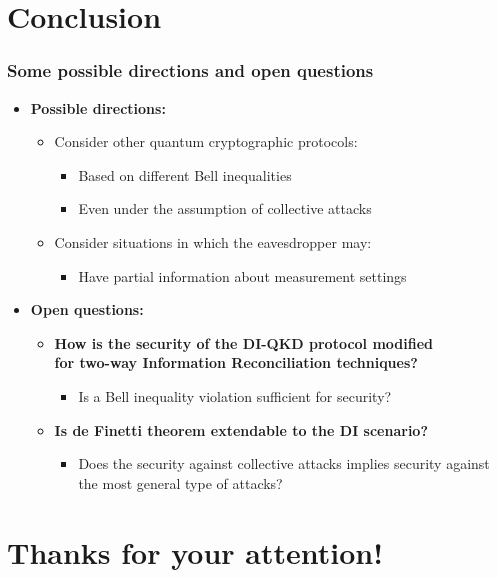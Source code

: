 \documentclass{beamer}
\begin{document}
    \section{Conclusion}

		\begin{frame}
			\frametitle{\Large Some possible directions and open questions}

            \vspace{3.5ex}
            \begin{itemize}
                \item \textbf{Possible directions:}
                \begin{itemize}
                    \item Consider other quantum cryptographic protocols:
                    \begin{itemize}
                        \item Based on different Bell inequalities
                        \item Even under the assumption of collective attacks 
                    \end{itemize}
                    \item Consider situations in which the eavesdropper may:
                    \begin{itemize}
                        \item Have partial information about measurement settings
                    \end{itemize}
                \end{itemize}
                \item \textbf{Open questions:}
                \begin{itemize}
                    \item \textbf{How is the security of the DI-QKD protocol modified\\ for two-way Information Reconciliation techniques?}
                    \begin{itemize}
                        \item Is a Bell inequality violation sufficient for security?
                    \end{itemize}
                    \item \textbf{Is de Finetti theorem extendable to the DI scenario?}
                    \begin{itemize}
                        \item Does the security against collective attacks implies security against the most general type of attacks?
                    \end{itemize}
                \end{itemize}
            \end{itemize}
            
		\end{frame}

    \section{Thanks for your attention!}
\end{document}
